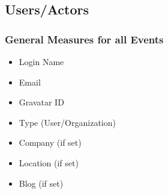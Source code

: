 \documentclass[a4paper,10pt]{article}
\begin{document}
\subsection{Users/Actors}
\subsubsection{General Measures for all Events}
\begin{itemize}
 \item Login Name
\item Email
\item Gravatar ID
\item Type (User/Organization)
\item Company (if set)
\item Location (if set)
\item Blog (if set)
\end{itemize}
\end{document}
